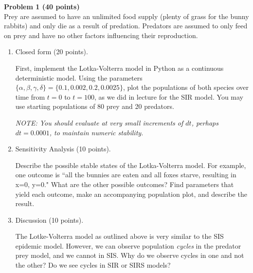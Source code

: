 \documentclass{article}
\newenvironment{problem}[2][Problem]
    { \begin{mdframed}[backgroundcolor=gray!20] \textbf{#1 #2} \\}
    {  \end{mdframed}}
\begin{document}
\begin{problem}{1 (40 points)}
Prey are assumed to have an unlimited food supply (plenty of grass for the bunny rabbits) and only die as a result of predation. Predators are assumed to only feed on prey and have no other factors influencing their reproduction.

\begin{enumerate}[label=(\alph*)]

    \item Closed form (20 points).

    First, implement the Lotka-Volterra model in Python as a continuous deterministic model. Using the parameters $\{\alpha,\beta,\gamma,\delta\} = \{0.1,0.002,0.2,0.0025\}$, plot the populations of both species over time from $t=0$ to $t=100$, as we did in lecture for the SIR model. You may use starting populations of 80 prey and 20 predators.

    \textit{NOTE: You should evaluate at very small increments of $dt$, perhaps $dt=0.0001$, to maintain numeric stability.}

    \item Sensitivity Analysis (10 points).

    Describe the possible stable states of the Lotka-Volterra model. For example, one outcome is ``all the bunnies are eaten and all foxes starve, resulting in x=0, y=0." What are the other possible outcomes? Find parameters that yield each outcome, make an accompanying population plot, and describe the result. 

    \item Discussion (10 points).

    The Lotke-Volterra model as outlined above is very similar to the SIS epidemic model. However, we can observe population \textit{cycles} in the predator prey model, and we cannot in SIS. Why do we observe cycles in one and not the other? Do we see cycles in SIR or SIRS models?

\end{enumerate}

\end{problem}
\clearpage
\end{document}
